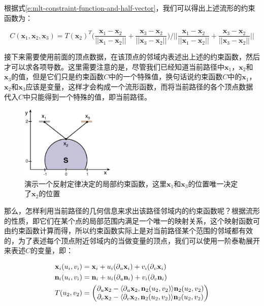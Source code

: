 \noindent 根据式\ref{e:mlt-constraint-function-and-half-vector}，我们可以得出上述流形的约束函数为：

\begin{equation}\label{e:mlt-example-c}
	C(\mathbf{x}_1,\mathbf{x}_2,\mathbf{x}_3)=T(\mathbf{x}_2)^{T}\Biggl(\frac{\mathbf{x}_1-\mathbf{x}_2}{||\mathbf{x}_1-\mathbf{x}_2||}+\frac{\mathbf{x}_3-\mathbf{x}_2}{||\mathbf{x}_3-\mathbf{x}_2||}\Biggl) \Biggl/
		\Biggl|\Biggl|\frac{\mathbf{x}_1-\mathbf{x}_2}{||\mathbf{x}_1-\mathbf{x}_2||}+\frac{\mathbf{x}_3-\mathbf{x}_2}{||\mathbf{x}_3-\mathbf{x}_2||}\Biggl|\Biggl|
\end{equation}

接下来需要使用前面的顶点数据，在该顶点的邻域内表述出上述的约束函数，然后才可以求各项导数。这里需要注意的是，尽管我们已经知道当前路径中$\mathbf{x}_1$，$\mathbf{x}_2$和$\mathbf{x}_3$的值，但是它们只是约束函数$C$中的一个特殊值，换句话说约束函数$C$中的$\mathbf{x}_1$，$\mathbf{x}_2$和$\mathbf{x}_3$应该是变量，这样才会构成一个流形函数，而将当前路径的各个顶点数据代入$C$中只能得到一个特殊的值，即当前路径。

\begin{figure}
	\sidecaption
	\includegraphics[width=0.4\textwidth]{figures/mlt/example}
	\caption{演示一个反射定律决定的局部约束函数，这里$\mathbf{x}_1$和$\mathbf{x}_3$的位置唯一决定了$\mathbf{x}_2$的位置}
	\label{f:mlt-example}
\end{figure}

那么，怎样利用当前路径的几何信息来求出该路径邻域内的约束函数呢？根据流形的性质，即它们在某个点的局部范围内满足一个唯一的映射关系，这个映射函数可由约束函数计算而得，所以约束函数实际上是对当前路径某个范围的邻域都有效的，为了表述每个顶点附近邻域内的当做变量的顶点，我们可以使用一阶泰勒展开来表述$C$的变量，即：

\begin{equation}
\begin{aligned}
	\mathbf{x}_i(u_i,v_i)&=\mathbf{x}_i+u_i({\rm \partial}_u\mathbf{x}_i)+v_i({\rm \partial}_v\mathbf{x}_i)\\
	\mathbf{n}_i(u_i,v_i)&=\mathbf{n}_i+u_i({\rm \partial}_u\mathbf{n}_i)+v_i({\rm \partial}_v\mathbf{n}_i)\\
	T(u_2,v_2)&=\begin{pmatrix}
		{\rm \partial}_u\mathbf{x}_2-\langle{\rm \partial}_u\mathbf{x}_2,\mathbf{n}_2(u_2,v_2)\rangle\mathbf{n}_2(u_2,v_2)\\
		{\rm \partial}_v\mathbf{x}_2-\langle{\rm \partial}_v\mathbf{x}_2,\mathbf{n}_2(u_2,v_2)\rangle\mathbf{n}_2(u_2,v_2)
	\end{pmatrix}
\end{aligned}
\end{equation}

